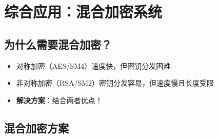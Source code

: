 \documentclass[12pt,a4paper]{article}
\begin{document}
\section{综合应用：混合加密系统}

\subsection{为什么需要混合加密？}

\begin{keybox}[问题]
\begin{itemize}
\item 对称加密（AES/SM4）速度快，但密钥分发困难
\item 非对称加密（RSA/SM2）密钥分发容易，但速度慢且长度受限
\item \textbf{解决方案}：结合两者优点！
\end{itemize}
\end{keybox}

\subsection{混合加密方案}
\end{document}
